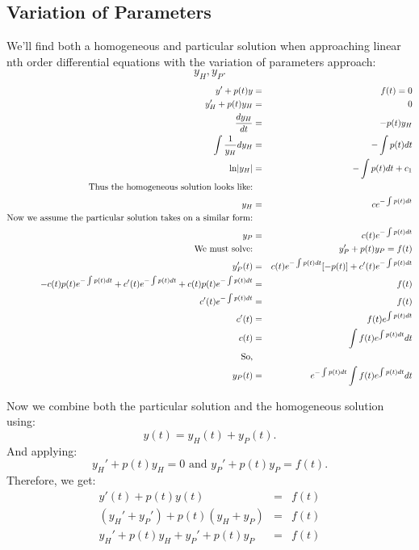 \documentclass[10pt]{article}
\begin{document}
    \subsection{Variation of Parameters}
        We'll find both a homogeneous and particular solution when approaching linear nth order differential equations with the variation of parameters approach: $$y_H, y_P.$$
        \begin{eqnarray*}
            y'+p(t)y&=&f(t)=0\\
            y_H'+p(t)y_H&=&0\\
            \frac{dy_H}{dt}&=&-p(t)y_H\\
            \int{\frac{1}{y_H}dy_H}&=&-\int{p(t)dt}\\
            \ln\abs{y_H}&=&-\int{p(t)dt}+c_1\\
            \text{Thus the homogeneous solution looks like:}\\
            y_H&=&ce^{-\int{p(t)dt}}\\
            \text{Now we assume the particular solution takes on a similar form:}\\
            y_P&=&c(t)e^{-\int{p(t)dt}}\\
            \text{We must solve:} && y_P'+p(t)y_P=f(t)\\
            y_P'(t)&=&c(t)e^{-\int{p(t)dt}}[-p(t)]+c'(t)e^{-\int{p(t)dt}}\\
            -c(t)p(t)e^{-\int{p(t)dt}}+c'(t)e^{-\int{p(t)dt}}+c(t)p(t)e^{-\int{p(t)dt}}&=&f(t)\\
            c'(t)e^{-\int{p(t)dt}}&=&f(t)\\
            c'(t)&=&f(t)e^{\int{p(t)dt}}\\
            c(t)&=&\int{f(t)e^{\int{p(t)dt}}dt}\\
            \text{So,}\\
            y_P(t)&=&e^{-\int{p(t)dt}}\int{f(t)e^{\int{p(t)dt}}dt}\\
        \end{eqnarray*}
        
        Now we combine both the particular solution and the homogeneous solution using: 
        $$y(t)=y_H(t)+y_P(t).$$
        And applying: $$y_H'+p(t)y_H=0 \text{ and } y_P'+p(t)y_P=f(t).$$
        Therefore, we get:
        \begin{eqnarray*}
            y'(t)+p(t)y(t)&=&f(t)\\
            (y_H'+y_P')+p(t)(y_H+y_P)&=&f(t)\\
            y_H'+p(t)y_H+y_P'+p(t)y_P&=&f(t)
        \end{eqnarray*}
        
\end{document}
